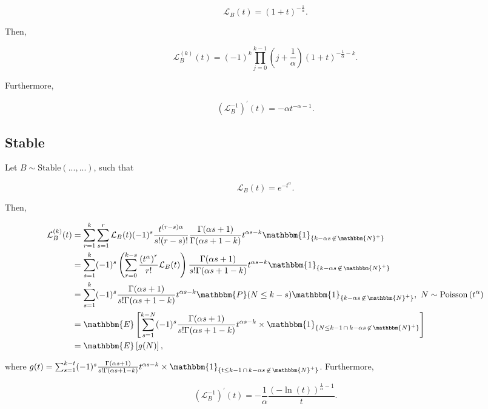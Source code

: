 \documentclass[11pt, english]{article}\usepackage[]{graphicx}\usepackage[]{color}
\begin{document}
\begin{equation}
  \mathcal{L}_B(t) = (1 + t)^{-\frac{1}{\alpha}}.
\end{equation}

Then,

$$ \mathcal{L}_B^{(k)}(t) = (-1)^k \prod_{j = 0}^{k - 1} \left(j + \frac{1}{\alpha}\right) (1 + t)^{-\frac{1}{\alpha} - k}. $$

Furthermore,

$$ \left(\mathcal{L}_B^{-1}\right)^\prime(t) = -\alpha t^{-\alpha - 1}. $$

\subsection{Stable}

Let $B \sim \mathrm{Stable}(..., ...)$, such that

\begin{equation}
  \mathcal{L}_B(t) = e^{-t^\alpha}.
\end{equation}

Then,

\begin{align*}
  \mathcal{L}^{(k)}_B(t) &= \sum_{r = 1}^k \sum_{s = 1}^r \mathcal{L}_B(t) (-1)^s \frac{t^{(r - s) \alpha}}{s! (r - s)!} \frac{\Gamma(\alpha s + 1)}{\Gamma(\alpha s + 1 - k)} t^{\alpha s - k} \mathbbm{1}_{\{k - \alpha s \, \not\in \, \mathbbm{N}^+\}} \\
  &= \sum_{s = 1}^k (-1)^s \left( \sum_{r = 0}^{k - s} \frac{\left(t^{\alpha}\right)^r}{r!} \mathcal{L}_B(t) \right) \frac{\Gamma(\alpha s + 1)}{s! \Gamma(\alpha s + 1 - k)} t^{\alpha s - k} \mathbbm{1}_{\{k - \alpha s \, \not\in \, \mathbbm{N}^+\}} \\
  &= \sum_{s = 1}^k (-1)^s \frac{\Gamma(\alpha s + 1)}{s! \Gamma(\alpha s + 1 - k)} t^{\alpha s - k} \mathbbm{P}(N \le k - s) \mathbbm{1}_{\{k - \alpha s \, \not\in \, \mathbbm{N}^+\}}, \, \, N \sim \mathrm{Poisson}\left(t^\alpha\right) \\
  &= \mathbbm{E} \left[ \sum_{s = 1}^{k - N}(-1)^s \frac{\Gamma(\alpha s + 1)}{s! \Gamma(\alpha s + 1 - k)} t^{\alpha s - k} \times \mathbbm{1}_{\{N \le k - 1 \, \cap \, k - \alpha s \, \not\in \, \mathbbm{N}^+\}} \right] \\
  &= \mathbbm{E} \left[ g(N) \right],
\end{align*}

where $g(t) = \sum_{s = 1}^{k - t}(-1)^s \frac{\Gamma(\alpha s + 1)}{s! \Gamma(\alpha s + 1 - k)} t^{\alpha s - k} \times \mathbbm{1}_{\{t \le k - 1 \, \cap \, k - \alpha s \, \not\in \, \mathbbm{N}^+\}}$. Furthermore,

$$ \left(\mathcal{L}_B^{-1}\right)^{\prime}(t) = -\frac{1}{\alpha} \frac{(-\ln(t))^{\frac{1}{\alpha} - 1}}{t}. $$

\newpage



\end{document}

